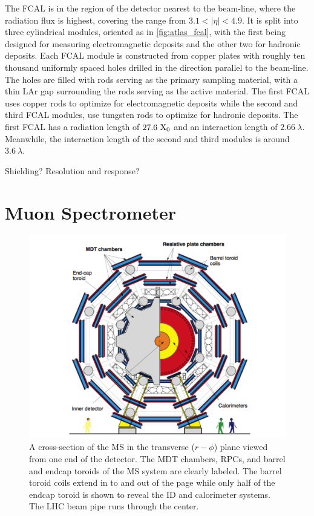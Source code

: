 The FCAL is in the region of the detector nearest to the beam-line, 
where the radiation flux is highest, covering the range
from $3.1 < |\eta| < 4.9$. It is split into three cylindrical modules,
oriented as in \fig\ref{fig:atlas_fcal}, with the first 
being designed for measuring electromagnetic deposits and the other
two for hadronic deposits.
Each FCAL module is constructed from copper plates with roughly ten thousand
uniformly spaced holes drilled in the direction parallel to the beam-line.
The holes are filled with rods serving as the primary sampling material, 
with a thin LAr gap surrounding the rods serving as the active material.
The first FCAL uses copper rods to optimize for electromagnetic deposits
while the second and third FCAL modules, use tungsten rods
to optimize for hadronic deposits.
The first FCAL has a radiation length of $27.6~\textrm{X}_0$ and an 
interaction length of $2.66~\lambda$. Meanwhile, the interaction
length of the second and third modules is around $3.6~\lambda$.



Shielding? Resolution and response?




\section{Muon Spectrometer}

\begin{figure}[ht]
\centering
\includegraphics[width=.8\textwidth]{figures/atlas/ms_rphi}
\caption{A cross-section of the MS in the 
transverse ($r-\phi$) plane viewed from one end of the detector. 
The MDT chambers, RPCs, and
barrel and endcap toroids of the MS system are clearly labeled.
The barrel toroid coils extend in to and out of the page while only
half of the endcap toroid is shown to reveal the ID and calorimeter
systems.  The LHC beam pipe runs through the center.}
\label{fig:atlas_ms_rphi}
\end{figure}

